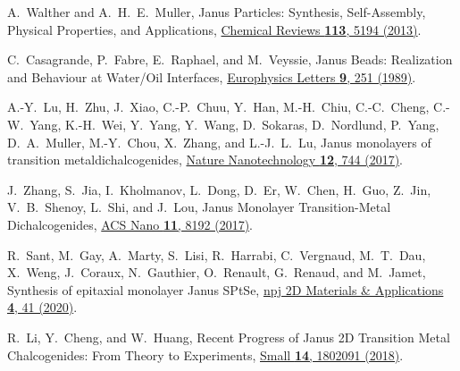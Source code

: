 \documentclass[reprint, superscriptaddress, amsmath,amssymb,prb,twocolumn]{revtex4-2}
\begin{document}


%
%

\begin{thebibliography}{116}

 A.~Walther and A.~H.~E.~Muller, Janus Particles: Synthesis, Self-Assembly, Physical Properties, and Applications, \href{https://dx.doi.org/10.1021/cr300089t}{Chemical Reviews {\bf 113}, 5194 (2013)}. %

 C.~Casagrande, P.~Fabre, E.~Raphael, and M.~Veyssie, Janus Beads: Realization and Behaviour at Water/Oil Interfaces, \href{https://dx.doi.org/10.1209/0295-5075/9/3/011}{Europhysics Letters {\bf 9}, 251 (1989)}. %

 A.-Y.~Lu, H.~Zhu, J.~Xiao, C.-P.~Chuu, Y.~Han, M.-H.~Chiu, C.-C.~Cheng, C.-W.~Yang, K.-H.~Wei, Y.~Yang, Y.~Wang, D.~Sokaras, D.~Nordlund, P.~Yang, D.~A.~Muller, M.-Y.~Chou, X.~Zhang, and L.-J.~L.~Lu, Janus monolayers of transition metaldichalcogenides, \href{https://dx.doi.org/10.1038/nnano.2017.100}{Nature Nanotechnology {\bf 12}, 744 (2017)}.

 J.~Zhang, S.~Jia, I.~Kholmanov, L.~Dong, D.~Er, W.~Chen, H.~Guo, Z.~Jin, V.~B.~Shenoy, L.~Shi, and J.~Lou, Janus Monolayer Transition-Metal Dichalcogenides, \href{https://dx.doi.org/10.1021/acsnano.7b03186}{ACS Nano {\bf 11}, 8192 (2017)}.

 R.~Sant, M.~Gay, A.~Marty, S.~Lisi, R.~Harrabi, C.~Vergnaud, M.~T.~Dau, X.~Weng, J.~Coraux, N.~Gauthier, O.~Renault, G.~Renaud, and M.~Jamet, Synthesis of epitaxial monolayer Janus SPtSe, \href{https://doi.org/10.1038/s41699-020-00175-z}{npj 2D Materials \& Applications {\bf 4}, 41 (2020)}.

 R.~Li, Y.~Cheng, and W.~Huang, Recent Progress of Janus 2D Transition Metal Chalcogenides: From Theory to Experiments, \href{https://dx.doi.org/10.1002/smll.201802091}{Small {\bf 14}, 1802091 (2018)}. %


\end{thebibliography}
\end{document}
